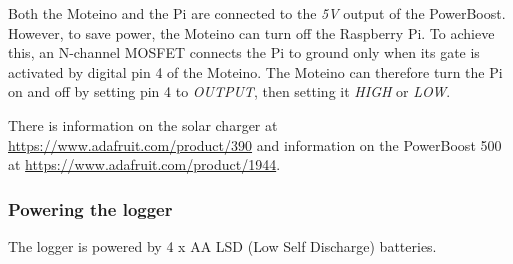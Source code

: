 \documentclass[10pt]{article}
\begin{document}
Both the Moteino and the Pi are connected to the \textit{5V} output of the PowerBoost. However, to save power, the Moteino can turn off the Raspberry Pi. To achieve this, an N-channel MOSFET connects the Pi to ground only when its gate is activated by digital pin 4 of the Moteino. The Moteino can therefore turn the Pi on and off by setting pin 4 to \textit{OUTPUT}, then setting it \textit{HIGH} or \textit{LOW}.

There is information on the solar charger at \url{https://www.adafruit.com/product/390} and information on the PowerBoost 500 at \url{https://www.adafruit.com/product/1944}.

\subsubsection{Powering the logger}

The logger is powered by 4 x AA LSD (Low Self Discharge) batteries.
\end{document}
